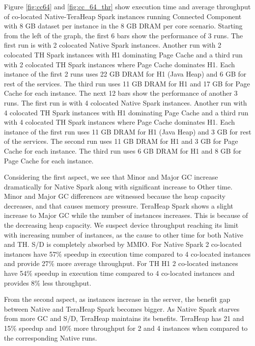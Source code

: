 Figure \ref{fig:cc64} and \ref{fig:cc_64_thr} show execution time and average throughput of co-located
Native-TeraHeap Spark instances running Connected Component with 8 GB
dataset per instance in the 8 GB DRAM per core scenario.
Starting from the left of the graph, the first 6 bars show the
performance of 3 runs. The first run is with 2 colocated Native Spark instances.
Another run with 2 colocated TH Spark instances with H1 dominating Page Cache
and a third run with 2 colocated TH Spark instances where Page Cache dominates H1.
Each instance of the first 2 runs uses 22 GB DRAM for H1 (Java Heap) and 6 GB for rest of the services.
The third run uses 11 GB DRAM for H1 and 17 GB for Page Cache for each instance. 
The next 12 bars show the performance of another 3 runs. The first run is with 4 colocated Native Spark instances.
Another run with 4 colocated TH Spark instances with H1 dominating Page Cache
and a third run with 4 colocated TH Spark instances where Page Cache dominates H1.
Each instance of the first run uses 11 GB DRAM for H1 (Java Heap) and 3 GB for rest of the services.
The second run uses 11 GB DRAM for H1 and 3 GB for Page Cache for each instance.
The third run uses 6 GB DRAM for H1 and 8 GB for Page Cache for each instance.

Considering the first aspect, we see that Minor and Major GC increase dramatically for Native Spark along with significant increase to Other time. Minor and Major GC differences are witnessed because the heap capacity decreases, and that causes memory pressure. TeraHeap Spark shows a slight increase to Major GC while the number of instances increases. This is because of the decreasing heap capacity. We suspect device throughput reaching its limit with increasing number of instances, as the cause to other time for both Native and TH. S/D is completely absorbed by MMIO. For Native Spark 2 co-located instances have 57\% speedup in execution time compared to 4 co-located instances and provide 27\% more average throughput. For TH H1 2 co-located instances have 54\% speedup in execution time compared to 4 co-located instances and provides 8\% less throughput.

From the second aspect, as instances increase in the server, the benefit gap between Native and TeraHeap Spark becomes bigger. As Native Spark starves from more GC and S/D, TeraHeap maintains its benefits. TeraHeap has 21 and 15\% speedup and 10\% more throughput for 2 and 4 instances when compared to the corresponding Native runs.

